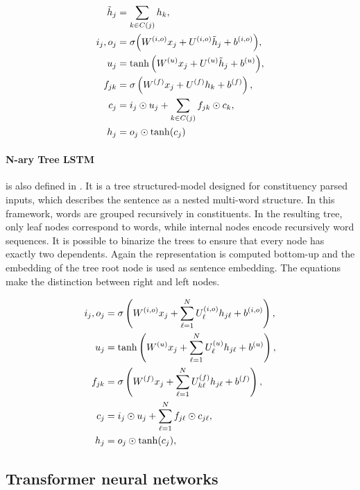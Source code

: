 \begin{align}
\tilde{h}_j &= \sum_{k \in C(j)} h_k, \labeq{treelstm-def} \\
i_j, o_j &=\sigma \Big( W^{(i, o)} x_j + U^{(i, o)} \tilde{h}_j + b^{(i, o)} \Big), \\
u_j &=\tanh \Big( W^{(u)} x_j + U^{(u)} \tilde{h}_j + b^{(u)} \Big), \\
f_{jk} &= \sigma\left( W^{(f)} x_j + U^{(f)} h_k + b^{(f)} \right), \labeq{treelstm-def-f}\\
c_j &= i_j \odot u_j + \sum_{k\in C(j)} f_{jk} \odot c_{k}, \\
h_j &= o_j \odot \tanh(c_j) \labeq{treelstm-def-last}
\end{align}

\paragraph{N-ary Tree LSTM} is also defined in \textcite{tai_15}. It is a tree structured-model designed for constituency parsed inputs, which describes the sentence as a nested multi-word structure. In this framework, words are grouped recursively in constituents. In the resulting tree, only leaf nodes correspond to words, while internal nodes encode recursively word sequences. It is possible to binarize the trees to ensure that every node has exactly two dependents. Again the representation is computed bottom-up and the embedding of the tree root node is used as sentence embedding. The equations make the distinction between right and left nodes.

\begin{align}
i_j, o_j &=\sigma \left( W^{(i, o)} x_j + \sum_{\ell=1}^N U^{(i, o)}_\ell h_{j\ell} + b^{(i, o)} \right), \labeq{nary-treelstm-def-first}\\
u_j &= \tanh\left( W^{(u)} x_j + \sum_{\ell=1}^N U^{(u)}_\ell h_{j\ell}  + b^{(u)} \right), \\
f_{jk} &= \sigma\left( W^{(f)} x_j + \sum_{\ell=1}^N U^{(f)}_{k\ell} h_{j\ell} + b^{(f)} \right), \labeq{nary-treelstm-def-f}\\
c_j &= i_j \odot u_j + \sum_{\ell=1}^N f_{j\ell} \odot c_{j\ell}, \\
h_j &= o_j \odot \tanh(c_j), \labeq{nary-treelstm-def-last}
\end{align}

\subsection{Transformer neural networks}

